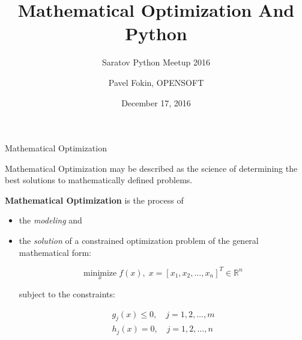 \documentclass[10pt,utf8,presentation]{beamer}
\begin{document}
\title{Mathematical Optimization And Python}
\subtitle{Saratov Python Meetup 2016}
\author{Pavel Fokin, OPENSOFT}
\date{December 17, 2016}


\frame{\titlepage}


\begin{frame}{Mathematical Optimization}


\alert{Mathematical Optimization} may be described as the science of determining the best solutions to mathematically defined problems.

\textbf{Mathematical Optimization} is the process of 

\begin{itemize}
 \item the \emph{modeling} and
 \item the \emph{solution} of a constrained optimization problem of the general mathematical form:
 
 \[
  \underset{x}{\text{minimize}} \; f(x), \; x = [x_1, x_2, \ldots, x_n]^T \in \mathbb{R}^n
 \]

 subject to the constraints:

\begin{equation*}
\begin{aligned}
  g_j(x) \leq 0, \quad j = 1, 2, \ldots, m \\
  h_j(x) = 0, \quad j = 1, 2, \ldots, n 
\end{aligned}
\end{equation*}

 
\end{itemize}

\end{frame}
\end{document}
